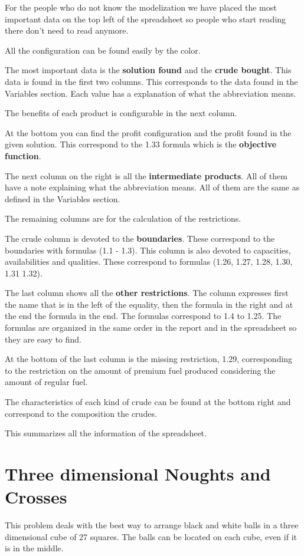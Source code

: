\documentclass[12pt,a4paper]{report}
\begin{document}
For the people who do not know the modelization we have placed the most important data on the top left of the spreadsheet so people who start reading there don't need to read anymore.

All the configuration can be found easily by the color.

The most important data is the \textbf{solution found} and the \textbf{crude bought}. This data is found in the first two columns. This corresponds to the data found in the Variables section. Each value has a explanation of what the abbreviation means.

The benefits of each product is configurable in the next column.

At the bottom you can find the profit configuration and the profit found in the given solution. This correspond to the 1.33 formula which is the \textbf{objective function}.

The next column on the right is all the \textbf{intermediate products}. All of them have a
note explaining what the abbreviation means. All of them are the same as defined in the Variables section.

The remaining columns are for the calculation of the restrictions. 

The crude column is devoted to the \textbf{boundaries}. These correspond to the
boundaries with formulas (1.1 - 1.3). This column is also devoted to capacities, availabilities and qualities. These correspond to formulas (1.26, 1.27, 1.28, 1.30, 1.31 1.32).

The last column shows all the \textbf{other restrictions}. The column expresses first the name that
is in the left of the equality, then the formula in the right and at the end the formula in the end. The formulas correspond to 1.4 to 1.25. The formulas are organized in the same
order in the report and in the spreadsheet so they are easy to find.

At the bottom of the last column is the missing restriction, 1.29, corresponding to the
restriction on the amount of premium fuel produced considering the amount of regular fuel.

The characteristics of each kind of crude can be found at the bottom right and correspond to the composition the crudes.

This summarizes all the information of the spreadsheet.

\chapter{Three dimensional Noughts and Crosses}
This problem deals with the best way to arrange black and white balls in a three dimensional cube of 27 squares. The balls can be located on each cube, even if it is in the middle.
\end{document}
